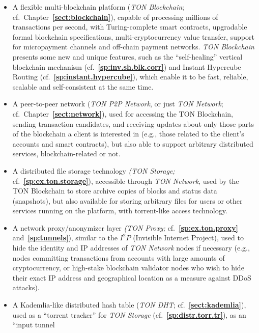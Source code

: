 \documentclass[12pt,oneside]{article}
\def\refpoint#1{{\rm\textbf{\ref{#1}}}}
\let\ptref=\refpoint
\begin{document}
\begin{English}
    \begin{itemize}
    \item A flexible multi-blockchain platform ({\em TON Blockchain};
      cf.\ Chapter~\ptref{sect:blockchain}), capable of processing
      millions of transactions per second, with Turing-complete smart
      contracts, upgradable formal blockchain specifications,
      multi-cryptocurrency value transfer, support for micropayment
      channels and off-chain payment networks. {\em TON Blockchain\/}
      presents some new and unique features, such as the ``self-healing''
      vertical block\-chain mechanism (cf.~\ptref{sp:inv.sh.blk.corr}) and
      Instant Hypercube Routing (cf.~\ptref{sp:instant.hypercube}), which
      enable it to be fast, reliable, scalable and self-consistent at the
      same time.
    \item A peer-to-peer network ({\em TON P2P Network}, or just {\em TON
      Network}; cf.\ Chapter~\ptref{sect:network}), used for accessing the
      TON Block\-chain, sending transaction candidates, and receiving
      updates about only those parts of the blockchain a client is
      interested in (e.g., those related to the client's accounts and
      smart contracts), but also able to support arbitrary distributed
      services, blockchain-related or not.
    \item A distributed file storage technology {\em (TON Storage;}
      cf.~\ptref{sp:ex.ton.storage}), accessible through {\em TON
        Network}, used by the TON Blockchain to store archive copies of
      blocks and status data (snapshots), but also available for storing
      arbitrary files for users or other services running on the platform,
      with torrent-like access technology.
    \item A network proxy/anonymizer layer {\em (TON Proxy;}
      cf.~\ptref{sp:ex.ton.proxy} and~\ptref{sp:tunnels}), similar to the
      $I^2P$ (Invisible Internet Project), used to hide the identity and
      IP addresses of {\em TON Network\/} nodes if necessary (e.g., nodes
      committing transactions from accounts with large amounts of
      cryptocurrency, or high-stake blockchain validator nodes who wish to
      hide their exact IP address and geographical location as a measure
      against DDoS attacks).
    \item A Kademlia-like distributed hash table ({\em TON DHT};
      cf.~\ptref{sect:kademlia}), used as a ``torrent tracker'' for {\em
        TON Storage} (cf.~\ptref{sp:distr.torr.tr}), as an ``input tunnel

\end{itemize}
\end{English}
\end{document}
